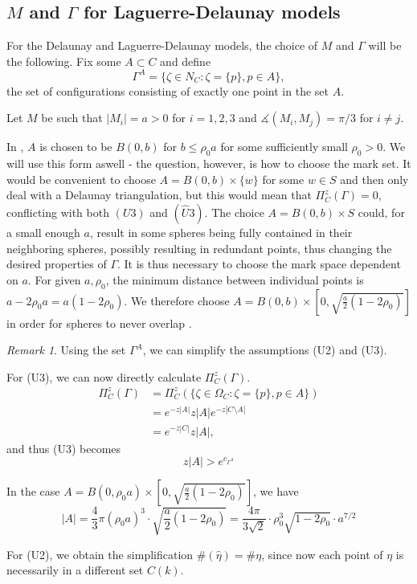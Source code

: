 \documentclass[12pt,a4paper]{article}
\theoremstyle{definition}
\theoremstyle{remark}
\newtheorem{remark}{Remark}
\theoremstyle{theorem}
\begin{document}
\subsection{$M$ and $\Gamma$ for Laguerre-Delaunay models}\label{sec:MGamma}
For the Delaunay and Laguerre-Delaunay models, the choice of $M$ and $\Gamma$ will be the following. Fix some $A \subset C$ and define
$$\Gamma^A = \{\zeta \in N_C: \zeta = \{p\}, p \in A\},$$
the set of configurations consisting of exactly one point in the set $A$.

Let $M$ be such that $|M_i| = a > 0$ for $i=1,2,3$ and $\measuredangle(M_i,M_j) = \pi / 3$ for $i\neq j$.

In \cite{DDG12}, $A$ is chosen to be $B(0,b)$ for $b\leq \rho_0 a$ for some  sufficiently small $\rho_0 >0$. We will use this form aswell - the question, however, is how to choose the mark set. It would be convenient to choose $A=B(0,b)\times\{w\}$ for some $w\in S$ and then only deal with a Delaunay triangulation, but this would mean that $\Pi^z_C(\Gamma) = 0$, conflicting with both $(U3)$ and $(\hat U3)$. The choice $A=B(0,b)\times S$ could, for a small enough $a$, result in some spheres being fully contained in their neighboring spheres, possibly resulting in redundant points, thus changing the desired properties of $\Gamma$. It is thus necessary to choose the mark space dependent on $a$. For given $a,\rho_0$, the minimum distance between individual points is $a-2\rho_0 a = a(1-2\rho_0)$. We therefore choose $A = B(0,b)\times [0, \sqrt{\frac a2(1-2\rho_0)}]$ in order for spheres to never overlap . 

\begin{remark}\label{r:UA}
	Using the set $\Gamma^A$, we can simplify the assumptions (U2) and (U3).
	
	For (U3), we can now directly calculate $\Pi^z_C(\Gamma)$.
	\begin{align*} 
		\Pi^z_C(\Gamma) &= \Pi^z_C(\{\zeta \in \Omega_C: \zeta = \{p\}, p \in A\}) \\
		& = e^{-z|A|} z |A| e^{-z|C\setminus A|} \\
		& = e^{-z|C|} z |A|,
	\end{align*}
	and thus (U3) becomes
	$$z|A| > e^{c_{\Gamma^A}}$$

	In the case $A = B(0,\rho_0 a)\times [0, \sqrt{\frac a2(1-2\rho_0)}]$, we have
	$$|A| = \frac 43 \pi (\rho_0 a)^3 \cdot \sqrt{\frac a2(1-2\rho_0)} = \frac {4\pi}{3\sqrt{2}}\cdot  \rho_0^3 \sqrt{1-2\rho_0} \cdot a^{7/2}$$

	For (U2), we obtain the simplification $\#(\hat\eta) = \#\eta$, since now each point of $\eta$ is necessarily in a different set $C(k)$.
\end{remark}
\end{document}
